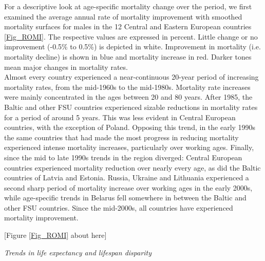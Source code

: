 \documentclass{article}
\begin{document}
\begin{spacing}{1.5}
For a descriptive look at age-specific mortality change over the period, we first examined the average annual rate of mortality improvement \citep{Rau2013} with smoothed mortality surfaces \citep{Camarda2012} for males in the 12 Central and Eastern European countries \ref{Fig_ROMI}. The respective values are expressed in percent. Little change or no improvement (-0.5\% to 0.5\%) is depicted in white. Improvement in mortality (i.e. mortality decline) is shown in blue and mortality increase in red. Darker tones mean major changes in mortality rates.\\

Almost every country experienced a near-continuous 20-year period of increasing mortality rates, from the mid-1960s to the mid-1980s. Mortality rate increases were mainly concentrated in the ages between 20 and 80 years. \textcolor[rgb]{1,0,0}{After 1985, the Baltic and other FSU countries experienced sizable reductions in mortality rates for a period of around 5 years. This was less evident in Central European countries, with the exception of Poland. Opposing this trend, in the early 1990s the same countries that had made the most progress in reducing mortality experienced intense mortality increases, particularly over working ages. Finally, since the mid to late 1990s trends in the region diverged: Central European countries experienced mortality reduction over nearly every age, as did the Baltic countries of Latvia and Estonia. Russia, Ukraine and Lithuania experienced a second sharp period of mortality increase over working ages in the early 2000s, while age-specific trends in Belarus fell somewhere in between the Baltic and other FSU countries. Since the mid-2000s, all countries have experienced mortality improvement}.\\



\begin{center}
[Figure \ref{Fig_ROMI} about here]
\end{center}

\emph{Trends in life expectancy and lifespan disparity}\\


\end{spacing}
\end{document}
